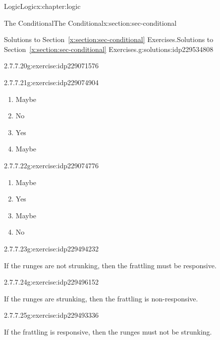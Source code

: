 \documentclass[twoside,10pt,]{book}
\newcommand{\xreffont}{\relax}
\numberwithin{equation}{section}
\begin{document}
\begin{chapterptx}{Logic}{}{Logic}{}{}{x:chapter:logic}
\begin{sectionptx}{The Conditional}{}{The Conditional}{}{}{x:section:sec-conditional}
\begin{solutions-subsection}{Solutions to Section~{\xreffont\ref*{x:section:sec-conditional}} Exercises.}{}{Solutions to Section~{\xreffont\ref*{x:section:sec-conditional}} Exercises.}{}{}{g:solutions:idp229534808}
\begin{divisionsolution}{2.7.7.20}{}{g:exercise:idp229071576}
\begin{enumerate}[label=(\alph*)]
\end{enumerate}
\end{divisionsolution}%
\begin{exercisegroup}
\begin{divisionsolutioneg}{2.7.7.21}{}{g:exercise:idp229074904}%
\par\smallskip%
\noindent\hypertarget{g:solution:idp229072472-main}{}%
\begin{enumerate}[label=(\alph*)]
\item{}Maybe%
\item{}No%
\item{}Yes%
\item{}Maybe%
\end{enumerate}
\end{divisionsolutioneg}%
\begin{divisionsolutioneg}{2.7.7.22}{}{g:exercise:idp229074776}%
\par\smallskip%
\noindent\hypertarget{g:solution:idp229490776-main}{}%
\begin{enumerate}[label=(\alph*)]
\item{}Maybe%
\item{}Yes%
\item{}Maybe%
\item{}No%
\end{enumerate}
\end{divisionsolutioneg}%
\end{exercisegroup}
\par\medskip\noindent
\begin{exercisegroup}
\begin{divisionsolutioneg}{2.7.7.23}{}{g:exercise:idp229494232}%
\par\smallskip%
\noindent\hypertarget{g:solution:idp229496280-main}{}If the runges are not strunking, then the frattling must be responsive.\end{divisionsolutioneg}%
\begin{divisionsolutioneg}{2.7.7.24}{}{g:exercise:idp229496152}%
\par\smallskip%
\noindent\hypertarget{g:solution:idp229493720-main}{}If the runges are strunking, then the frattling is non-responsive.\end{divisionsolutioneg}%
\begin{divisionsolutioneg}{2.7.7.25}{}{g:exercise:idp229493336}%
\par\smallskip%
\noindent\hypertarget{g:solution:idp229491416-main}{}If the frattling is responsive, then the runges must not be strunking.\end{divisionsolutioneg}%

\end{exercisegroup}
\end{solutions-subsection}
\end{sectionptx}
\end{chapterptx}
\end{document}
